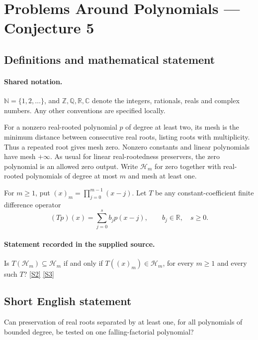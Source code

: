 \documentclass[11pt]{article}
\newcommand{\sref}[2]{\hyperlink{source:#1:#2}{[S#2]}}
\begin{document}
\section{Problems Around Polynomials — Conjecture 5}\label{statement}

\subsection{Definitions and mathematical statement}

\paragraph{Shared notation.}$\mathbb N=\{1,2,\ldots\}$, and $\mathbb Z,\mathbb Q,\mathbb R,\mathbb C$ denote the integers, rationals, reals and complex numbers. Any other conventions are specified locally.


For a nonzero real-rooted polynomial $p$ of degree at least two, its mesh is the minimum distance between consecutive real roots, listing roots with multiplicity. Thus a repeated root gives mesh zero. Nonzero constants and linear polynomials have mesh $+\infty$. As usual for linear real-rootedness preservers, the zero polynomial is an allowed zero output. Write $\mathcal H_m$ for zero together with real-rooted polynomials of degree at most $m$ and mesh at least one.\par For $m\geq1$, put $(x)_m=\prod_{j=0}^{m-1}(x-j)$. Let $T$ be any constant-coefficient finite difference operator
\[(Tp)(x)=\sum_{j=0}^s b_jp(x-j),\qquad b_j\in\mathbb R,\quad s\geq0.\]
\paragraph{Statement recorded in the supplied source.}
Is $T(\mathcal H_m)\subseteq\mathcal H_m$ if and only if $T((x)_m)\in\mathcal H_m$, for every $m\geq1$ and every such $T$? \sref{statement}{2} \sref{statement}{3}
\subsection{Short English statement}
Can preservation of real roots separated by at least one, for all polynomials of bounded degree, be tested on one falling-factorial polynomial?
\end{document}
